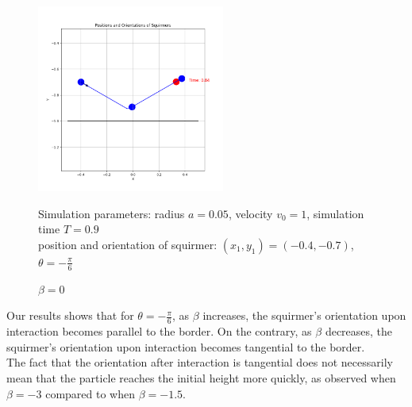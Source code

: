 \documentclass{article}
\begin{document}
\begin{figure}[H]
    \centering
    \includegraphics[width=0.55\textwidth]{graphs/simulations/border/beta0/mpi_6.png}
    \caption{\footnotesize $\beta = 0$}
    Simulation parameters: radius $a=0.05$, velocity $v_0=1$, simulation time $T=0.9$\\
        position and orientation of squirmer: $(x_1,y_1)=(-0.4,-0.7)$, $\theta=-\frac{\pi}{6}$
\end{figure}
Our results shows that for $\theta = -\frac{\pi}{6}$, as $\beta$ increases, the squirmer's orientation upon interaction becomes parallel to the border.
On the contrary, as $\beta$ decreases, the squirmer's orientation upon interaction becomes tangential to the border.\\
The fact that the orientation after interaction is tangential does not necessarily mean that the particle reaches the initial 
height more quickly, as observed when $\beta = -3$ compared to when $\beta = -1.5$.
\end{document}
